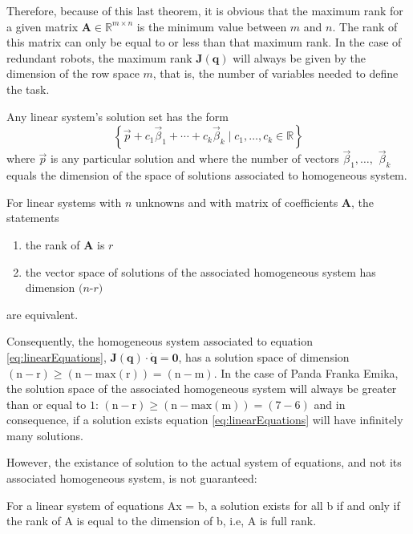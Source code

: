 Therefore, because of this last theorem, it is obvious that the maximum rank for a given matrix $\mathbf{A} \in \mathbb{R}^{m \times n} $ is the minimum value between $m$ and $n$. The rank of this matrix can only be equal to or less than that maximum rank. In the case of redundant robots, the maximum rank ${\mathbf{J}(\mathbf{{q}})}$ will always be given by the dimension of the row space $m$, that is, the number of variables needed to define the task.

\begin{theorem}
    Any linear system's solution set has the form
\[
\left\{\vec{p}+c_{1} \vec{\beta}_{1}+\cdots+c_{k} \vec{\beta}_{k} \mid c_{1}, \ldots, c_{k} \in \mathbb{R}\right\}
\]
where \( \vec{p} \) is any particular solution and where the number of vectors \( \vec{\beta}_{1}, \ldots, \) \( \vec{\beta}_{k} \) equals the dimension of the space of solutions associated to homogeneous system.
\end{theorem}

\begin{theorem}
For linear systems with $n$ unknowns and with matrix of coefficients $\mathbf{A}$, the statements
\begin{enumerate}
    \item the rank of $\mathbf{A}$ is $r$
    \item the vector space of solutions of the associated homogeneous system has dimension $(n$-$r)$
\end{enumerate}
are equivalent.
\end{theorem}


Consequently, the homogeneous system associated to equation \ref{eq:linearEquations}, ${\mathbf{J}(\mathbf{{q}})} \cdot  {\mathbf{\dot{q}}} = {\mathbf{0}}$, has a solution space of dimension $(\text{n} - \text{r}) \geq (\text{n} - \text{max}({\text{r}})) = (\text{n} - \text{m})$. In the case of Panda Franka Emika, the solution space of the associated homogeneous system will always be greater than or equal to $1$: $(\text{n} - \text{r}) \geq (\text{n} - \text{max}(\text{m})) = (7-6)$ and in consequence, if a solution exists equation \ref{eq:linearEquations} will have infinitely many solutions.

However, the existance of solution to the actual system of equations, and not its associated homogeneous system, is not guaranteed:

\begin{theorem}
    For a linear system of equations Ax = b, a solution exists for all b if and only if the rank of A is equal to the dimension of b, i.e, A is full rank.
\end{theorem}

